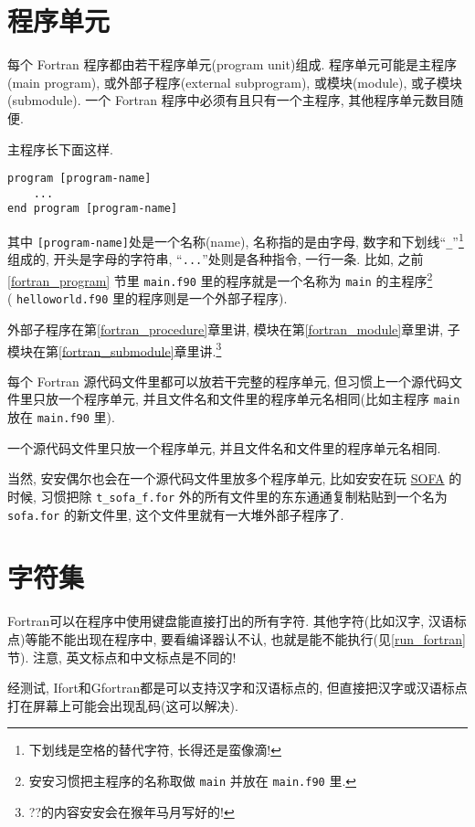 \section{程序单元}\label{program_unit}

每个 Fortran 程序都由若干程序单元(program unit)组成. 程序单元可能是主程序(main program), 或外部子程序(external subprogram), 或模块(module), 或子模块(submodule). 一个 Fortran 程序中必须有且只有一个主程序, 其他程序单元数目随便.

主程序长下面这样.
\begin{lstlisting}
program [program-name]
    ...
end program [program-name]
\end{lstlisting}
其中 \texttt{[program-name]}处是一个名称(name), 名称指的是由字母, 数字和下划线``\texttt{\_{}}''\footnote{
    下划线是空格的替代字符, 长得还是蛮像滴!
}组成的, 开头是字母的字符串, ``\texttt{...}''处则是各种指令, 一行一条. 比如, 之前 \ref{fortran_program} 节里 \texttt{main.f90} 里的程序就是一个名称为 \texttt{main} 的主程序\footnote{安安习惯把主程序的名称取做 \texttt{main} 并放在 \texttt{main.f90} 里.} \\( \texttt{helloworld.f90} 里的程序则是一个外部子程序).

外部子程序在第\ref{fortran_procedure}章里讲, 模块在第\ref{fortran_module}章里讲, 子模块在第\ref{fortran_submodule}章里讲.\footnote{??\mbox{}的内容安安会在猴年马月写好的!}

每个 Fortran 源代码文件里都可以放若干完整的程序单元, 但习惯上一个源代码文件里只放一个程序单元, 并且文件名和文件里的程序单元名相同(比如主程序 \texttt{main} 放在 \texttt{main.f90} 里).
\begin{convention}
    一个源代码文件里只放一个程序单元, 并且文件名和文件里的程序单元名相同.
\end{convention}
当然, 安安偶尔也会在一个源代码文件里放多个程序单元, 比如安安在玩 \href{https://iausofa.org/}{SOFA} 的时候, 习惯把除 \texttt{t\_{}sofa\_{}f.for} 外的所有文件里的东东通通复制粘贴到一个名为 \texttt{sofa.for} 的新文件里, 这个文件里就有一大堆外部子程序了.

\section{字符集}

Fortran可以在程序中使用键盘能直接打出的所有字符. 其他字符(比如汉字, 汉语标点)等能不能出现在程序中, 要看编译器认不认, 也就是能不能执行(见\ref{run_fortran}节). 注意, 英文标点和中文标点是不同的!

经测试, Ifort和Gfortran都是可以支持汉字和汉语标点的, 但直接把汉字或汉语标点打在屏幕上可能会出现乱码(这可以解决).

